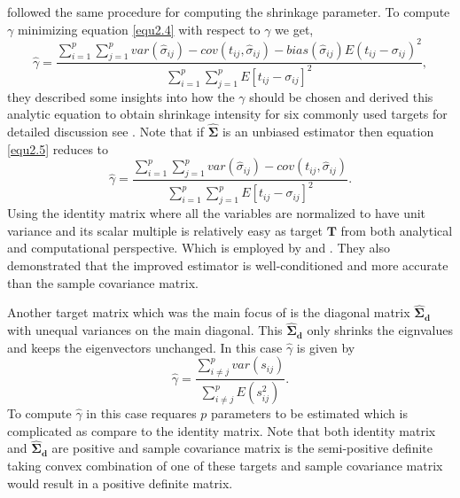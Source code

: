 \cite{schafer2005shrinkage} followed the same procedure for computing the shrinkage parameter. To compute $\gamma$ minimizing equation \ref{equ2.4} with respect to $\gamma$ we get,
\begin{equation}
\hat{\gamma} = \frac{\sum_{i=1}^{p} \sum_{j=1}^{p} var(\hat{\sigma}_{ij}) - cov(t_{ij}, \hat{\sigma}_{ij})- bias(\hat{\sigma}_{ij}) E(t_{ij} - \sigma_{ij})^{2}}{\sum_{i=1}^{p} \sum_{j=1}^{p} E [t_{ij} - \sigma_{ij}]^{2}},
  \label{equ2.5}
\end{equation}
they described some insights into how the $\gamma$ should be chosen and derived this analytic equation to obtain shrinkage intensity for six commonly used targets for detailed discussion see \citep{schafer2005shrinkage}. Note that if $\boldsymbol{\hat{\Sigma}}$ is an unbiased estimator then equation \ref{equ2.5} reduces to
\begin{equation}
\hat{\gamma} = \frac{\sum_{i=1}^{p} \sum_{j=1}^{p} var(\hat{\sigma}_{ij}) - cov(t_{ij}, \hat{\sigma}_{ij})}{\sum_{i=1}^{p} \sum_{j=1}^{p} E [t_{ij} - \sigma_{ij}]^{2}}.
\end{equation}
Using the identity matrix where all the variables are normalized to have unit variance and its scalar multiple is relatively easy as target $\boldsymbol{T}$ from both analytical and computational perspective. Which is employed by \cite{ledoit2003improved} and \cite{ledoit2004well}. They also demonstrated that the improved estimator is well-conditioned and more accurate than the sample covariance matrix. 

Another target matrix which was the main focus of \cite{schafer2005shrinkage} is the diagonal matrix $\boldsymbol{\hat{\Sigma}_{d}}$ with unequal variances on the main diagonal. This $\boldsymbol{\hat{\Sigma}_{d}}$ only shrinks the eignvalues and keeps the eigenvectors unchanged. In this case $\hat{\gamma}$ is given by
\begin{equation}
\hat{\gamma} = \frac{\sum_{i \neq j}^{p} var(s_{ij})}{\sum_{i \neq j}^{p} E(s_{ij}^2)}.
\end{equation}  
  To compute $\hat{\gamma}$ in this case requares $p$ parameters to be estimated which is complicated as compare to the identity matrix. Note that both identity matrix and $\boldsymbol{\hat{\Sigma}_{d}}$ are positive and sample covariance matrix is the semi-positive definite taking convex combination of one of these targets and sample covariance matrix would result in a positive definite matrix. 

